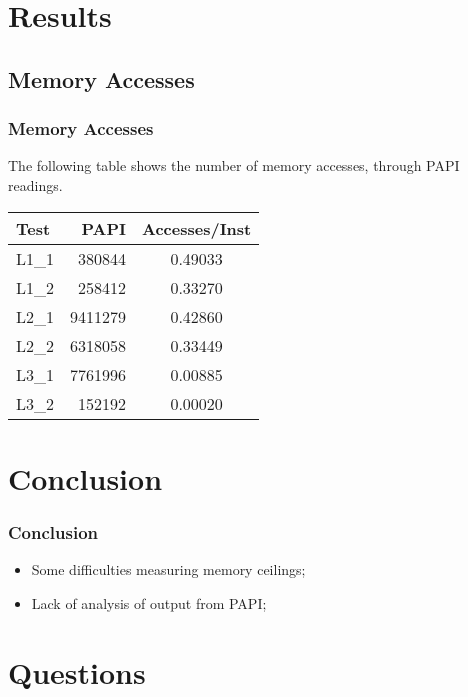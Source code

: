 \documentclass{beamer}
\begin{document}
\section{Results}
\subsection{Memory Accesses}


\begin{frame}
	\frametitle{Memory Accesses}

	The following table shows the number of memory accesses, through PAPI readings.

	\begin{table}[!htp]
		\begin{center}
		{\small
			\begin{tabular}{|l|r|c|}

				\hline
				Test	&	PAPI	&	 Accesses/Inst		\\
				\hline
				L1\_1	&	380844 & 0.49033 \\
				L1\_2	&	258412 & 0.33270 \\
				L2\_1	&	9411279	& 0.42860\\
				L2\_2	&	6318058	& 0.33449\\
				L3\_1   &	7761996 & 0.00885\\
				L3\_2   &   152192 & 0.00020\\
				\hline
			\end{tabular}
		}
		\end{center}
	\end{table}
\end{frame}


\section{Conclusion}
\begin{frame}
	\frametitle{Conclusion}
	\begin{itemize}
		\item Some difficulties measuring memory ceilings;
		\item Lack of analysis of output from PAPI;
	\end{itemize}
\end{frame}

\section{Questions}
\begin{frame}
	\titlepage
	
	
\end{frame}
\end{document}
